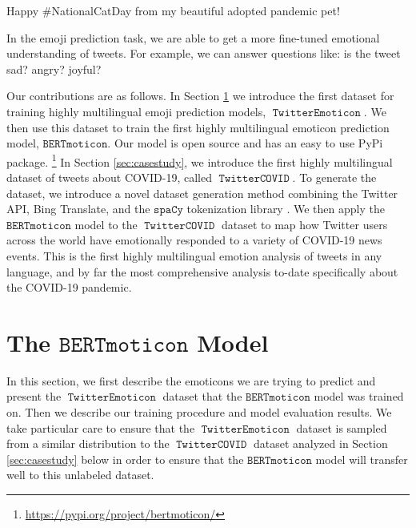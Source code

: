 \documentclass[11pt]{article}
\newcommand{\XXX}{{\color{red}\textbf{XXX}}~}
\newcommand{\bertmoji}{\texttt{BERTmoticon}}
\newcommand{\spacy}{\texttt{spaCy}}
\DeclareMathOperator{\emoticon}{\texttt{TwitterEmoticon}}
\DeclareMathOperator{\corona}{\texttt{TwitterCOVID}}
\begin{document}
\begin{displayquote}
    Happy \#NationalCatDay from my beautiful adopted pandemic pet!   
\end{displayquote}

In the emoji prediction task, we are able to get a more fine-tuned emotional understanding of tweets. For example, we can answer questions like: is the tweet sad? angry? joyful?


Our contributions are as follows.
In Section \ref{sec:bertmoji} we introduce the first dataset for training highly multilingual emoji prediction models, $\emoticon$.
We then use this dataset to train the first highly multilingual emoticon prediction model, $\bertmoji$.
Our model is open source and has an easy to use PyPi package.%
\footnote{
    \url{https://pypi.org/project/bertmoticon/}
}
In Section \ref{sec:casestudy}, we introduce the first highly multilingual dataset of tweets about COVID-19, called $\corona$.
To generate the dataset, we introduce a novel dataset generation method combining the Twitter API, Bing Translate, and the $\spacy$ tokenization library \citep{spacy2}.
We then apply the $\bertmoji$ model to the $\corona$ dataset to map how Twitter users across the world have emotionally responded to a variety of COVID-19 news events.
This is the first highly multilingual emotion analysis of tweets in any language,
and by far the most comprehensive analysis to-date specifically about the COVID-19 pandemic.


\section{The $\bertmoji$ Model}
\label{sec:bertmoji}

In this section, we first describe the emoticons we are trying to predict and present the $\emoticon$ dataset that the $\bertmoji$ model was trained on.
Then we describe our training procedure and model evaluation results.
We take particular care to ensure that the $\emoticon$ dataset is sampled from a similar distribution to the $\corona$ dataset analyzed in Section \ref{sec:casestudy} below in order to ensure that the $\bertmoji$ model will transfer well to this unlabeled dataset.
\end{document}
